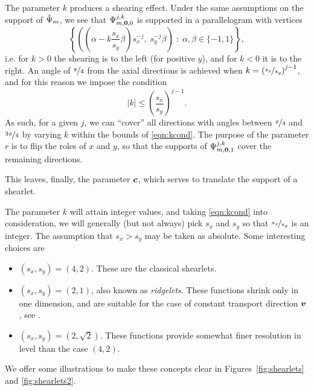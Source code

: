 The parameter $k$ produces a shearing effect. Under the same assumptions on the support of $\hat{\Psi}_m$, we see
that $\Psi_{m,{\bm0},0}^{j,k}$ is supported in a parallelogram with vertices
\[
    \left\{ \left(\left(\alpha-k\frac{s_x}{s_y}\beta\right)s_x^{-j}, \;s_y^{-j}\beta \right)
            \;:\; \alpha,\beta \in \{-1,1\} \right\},
\]
i.e. for $k>0$ the shearing is to the left (for positive $y$), and for $k<0$ it is to the right. An angle of
$\nicefrac{\pi}{4}$ from the axial directions is achieved when $k=\left(\nicefrac{s_x}{s_y}\right)^{j-1}$, and
for this reason we impose the condition
\begin{equation} \label{eqn:kcond}
    |k| \leq \left(\frac{s_x}{s_y}\right)^{j-1}.
\end{equation}
As such, for a given $j$, we can ``cover'' all directions with angles between $\nicefrac{\pi}{4}$ and
$\nicefrac{3\pi}{4}$ by varying $k$ within the bounds of \eqref{eqn:kcond}. The purpose of the parameter $r$
is to flip the roles of $x$ and $y$, so that the supports of $\Psi_{m,{\bm0},1}^{j,k}$ cover the remaining
directions.

This leaves, finally, the parameter ${\bm c}$, which serves to translate the support of a shearlet.

The parameter $k$ will attain integer values, and taking \eqref{eqn:kcond} into consideration, we will
generally (but not always) pick $s_x$ and $s_y$ so that $\nicefrac{s_x}{s_y}$ is an integer. The assumption
that $s_x>s_y$ may be taken as absolute. Some interesting choices are

\begin{itemize}
\item $(s_x,s_y) = (4,2)$. These are the classical shearlets.
\item $(s_x,s_y) = (2,1)$, also known as {\em ridgelets}. These functions shrink only in one dimension, and
are suitable for the case of constant transport direction ${\bm v}$, see \cite{Grohs12}.
\item $(s_x,s_y) = (2,\sqrt{2})$. These functions provide somewhat finer resolution in level than the case
$(4,2)$.
\end{itemize}

We offer some illustrations to make these concepts clear in Figures~\ref{fig:shearlets} and
\ref{fig:shearlets2}.

